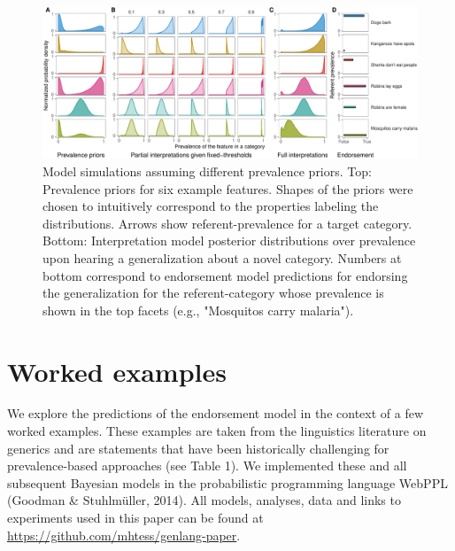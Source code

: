 \documentclass[english,,man,floatsintext]{apa6}
\theoremstyle{definition}
\theoremstyle{definition}
\theoremstyle{definition}
\theoremstyle{remark}
\begin{document}
\begin{figure}

{\centering \includegraphics[width=1\linewidth]{figs/simulations-1} 

}

\caption{Model simulations assuming different prevalence priors. Top: Prevalence priors for six example features. Shapes of the priors were chosen to intuitively correspond to the properties labeling the distributions. Arrows show referent-prevalence for a target category. Bottom: Interpretation model posterior distributions over prevalence upon hearing a generalization about a novel category. Numbers at bottom correspond to endorsement model predictions for endorsing the generalization for the referent-category whose prevalence is shown in the top facets (e.g., "Mosquitos carry malaria").}\label{fig:simulations}
\end{figure}

\hypertarget{worked-examples}{%
\section{Worked examples}\label{worked-examples}}

We explore the predictions of the endorsement model in the context of a
few worked examples. These examples are taken from the linguistics
literature on generics and are statements that have been historically
challenging for prevalence-based approaches (see Table 1). We
implemented these and all subsequent Bayesian models in the
probabilistic programming language WebPPL (Goodman \& Stuhlmüller,
2014). All models, analyses, data and links to experiments used in this
paper can be found at \url{https://github.com/mhtess/genlang-paper}.
\end{document}
